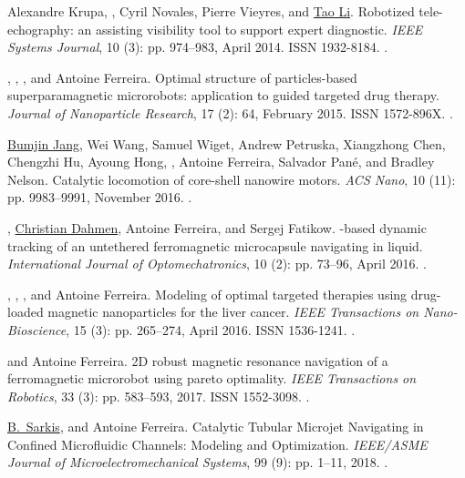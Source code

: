 \begin{Mybibliography}{99}
  Alexandre Krupa, \DavidFolio, Cyril Novales, Pierre Vieyres, and \uline{Tao Li}.
  \newblock Robotized tele-echography: an assisting visibility tool to support
  expert diagnostic.
  \newblock \emph{IEEE Systems Journal}, 10 (3): pp. 974--983, April 2014.
  \newblock ISSN 1932-8184.
  \newblock {}.
    
  \LMellal, \KBelharet, \DavidFolio, and Antoine Ferreira.
  \newblock Optimal structure of particles-based superparamagnetic microrobots:
  application to \MRIshort guided targeted drug therapy.
  \newblock \emph{Journal of Nanoparticle Research}, 17 (2):
  64, February 2015.
  \newblock ISSN 1572-896X.
  \newblock {}.

  \uline{Bumjin Jang}, Wei Wang, Samuel Wiget, Andrew Petruska, Xiangzhong Chen, Chengzhi
  Hu, Ayoung Hong, \DavidFolio, Antoine Ferreira, Salvador Pané, and Bradley
  Nelson.
  \newblock Catalytic locomotion of core-shell nanowire motors.
  \newblock \emph{ACS Nano}, 10 (11): pp. 9983--9991, November
  2016.
  \newblock {}.

  \DavidFolio, \uline{Christian Dahmen}, Antoine Ferreira, and Sergej Fatikow.
  \newblock \MRIshort-based dynamic tracking of an untethered ferromagnetic microcapsule navigating in liquid.
  \newblock \emph{International Journal of Optomechatronics}, 10 (2): pp. 73--96, April 2016.
  \newblock {}.
  
  \LMellal, \DavidFolio, \KBelharet, and Antoine Ferreira.
  \newblock Modeling of optimal targeted therapies using drug-loaded magnetic
  nanoparticles for the liver cancer.
  \newblock \emph{IEEE Transactions on Nano-Bioscience}, 15
  (3): pp. 265--274, April 2016{}.
  \newblock ISSN 1536-1241.
  \newblock {}.
  
  \DavidFolio and Antoine Ferreira.
  \newblock 2D robust magnetic resonance navigation of a ferromagnetic microrobot
  using pareto optimality.
  \newblock \emph{{IEEE} Transactions on Robotics}, 33 (3):
  pp. 583--593, 2017.
  \newblock ISSN 1552-3098.
  \newblock {}.

  
  \underline{B.~Sarkis}, \DavidFolio and Antoine Ferreira.
  \newblock Catalytic Tubular Microjet Navigating in Confined Microfluidic Channels: Modeling and Optimization.
  \newblock \emph{{IEEE/ASME} Journal of Microelectromechanical Systems}, 99 (9):
  pp. 1--11, 2018.
  \newblock {}.
  
\end{Mybibliography}

